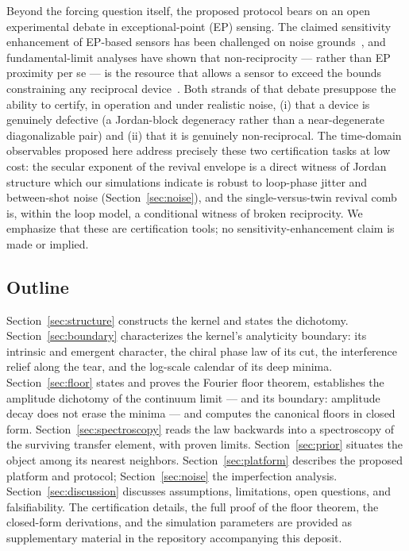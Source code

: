 \documentclass[11pt,a4paper]{article}
\begin{document}
Beyond the forcing question itself, the proposed protocol bears on an open
experimental debate in exceptional-point (EP) sensing. The claimed sensitivity
enhancement of EP-based sensors has been challenged on noise
grounds~\cite{Langbein2018,Wiersig2020}, and fundamental-limit analyses have
shown that non-reciprocity --- rather than EP proximity per se --- is the
resource that allows a sensor to exceed the bounds constraining any reciprocal
device~\cite{LauClerk2018}. Both strands of that debate presuppose the ability
to certify, in operation and under realistic noise, (i) that a device is
genuinely defective (a Jordan-block degeneracy rather than a near-degenerate
diagonalizable pair) and (ii) that it is genuinely non-reciprocal. The
time-domain observables proposed here address precisely these two
certification tasks at low cost: the secular exponent of the revival envelope
is a direct witness of Jordan structure which our simulations indicate is
robust to loop-phase jitter and between-shot noise (Section~\ref{sec:noise}),
and the single-versus-twin revival comb is, within the loop model, a
conditional witness of broken
reciprocity. We emphasize that these are certification tools; no
sensitivity-enhancement claim is made or implied.

\subsection{Outline}

Section~\ref{sec:structure} constructs the kernel and states the dichotomy.
Section~\ref{sec:boundary} characterizes the kernel's analyticity
boundary: its intrinsic and emergent character, the chiral phase law of
its cut, the interference relief along the tear, and the log-scale
calendar of its deep minima. Section~\ref{sec:floor} states and proves
the Fourier floor theorem, establishes the amplitude dichotomy of the
continuum limit --- and its boundary: amplitude decay does not erase the
minima --- and computes the canonical floors in closed form.
Section~\ref{sec:spectroscopy} reads the law backwards into a spectroscopy
of the surviving transfer element, with proven limits.
Section~\ref{sec:prior} situates the object among its nearest neighbors.
Section~\ref{sec:platform} describes the proposed platform and protocol;
Section~\ref{sec:noise} the imperfection analysis. Section~\ref{sec:discussion}
discusses assumptions, limitations, open questions, and falsifiability. The
certification details, the full proof of the floor theorem, the closed-form derivations, and the simulation
parameters are provided as supplementary material in the repository
accompanying this deposit.
\end{document}
